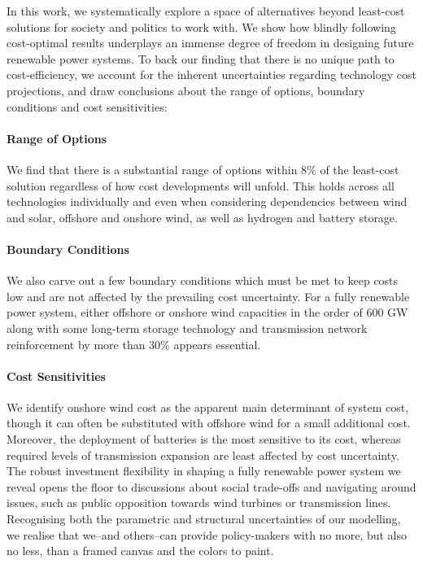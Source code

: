In this work, we
systematically explore a space of alternatives beyond least-cost solutions
for society and politics to work with.
We show how blindly following cost-optimal results
underplays an immense degree of freedom in designing future renewable power systems.
To back our finding that there is no unique path to cost-efficiency,
we account for the inherent uncertainties regarding technology cost projections,
and draw conclusions about the range of options, boundary conditions and cost sensitivities:

\paragraph{Range of Options}
We find that there is a substantial range of options
within 8\% of the least-cost solution
regardless of how cost developments will unfold.
This holds across all technologies individually
and even when considering dependencies between
wind and solar, offshore and onshore wind, as well as hydrogen and battery storage.

\paragraph{Boundary Conditions}
We also carve out a few boundary conditions which
must be met to keep costs low and are not affected
by the prevailing cost uncertainty.
For a fully renewable power system,
either offshore or onshore wind capacities
in the order of 600 GW
along with some long-term storage technology and
transmission network reinforcement by more than 30\% appears essential.

\paragraph{Cost Sensitivities}
We identify onshore wind cost as the apparent main determinant of system cost,
though it can often be substituted with offshore wind for a small additional cost.
Moreover, the deployment of batteries is the most sensitive to its cost,
whereas required levels of transmission expansion are least affected by cost uncertainty. \\

The robust investment flexibility in shaping a fully renewable power system
we reveal opens the floor to discussions about social trade-offs and navigating
around issues, such as public opposition towards wind turbines or transmission lines.
Recognising both the parametric and structural uncertainties of our modelling,
we realise that we--and others--can provide policy-makers with no more, but also no less,
than a framed canvas and the colors to paint.
